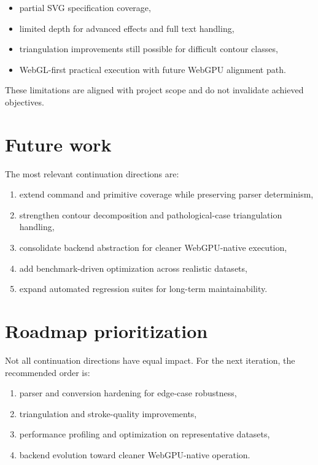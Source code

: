 \begin{itemize}
\item partial SVG specification coverage,
\item limited depth for advanced effects and full text handling,
\item triangulation improvements still possible for difficult contour classes,
\item WebGL-first practical execution with future WebGPU alignment path.
\end{itemize}

These limitations are aligned with project scope and do not invalidate achieved objectives.

\section{Future work}

The most relevant continuation directions are:

\begin{enumerate}
\item extend command and primitive coverage while preserving parser determinism,
\item strengthen contour decomposition and pathological-case triangulation handling,
\item consolidate backend abstraction for cleaner WebGPU-native execution,
\item add benchmark-driven optimization across realistic datasets,
\item expand automated regression suites for long-term maintainability.
\end{enumerate}

\section{Roadmap prioritization}

Not all continuation directions have equal impact.
For the next iteration, the recommended order is:

\begin{enumerate}
\item parser and conversion hardening for edge-case robustness,
\item triangulation and stroke-quality improvements,
\item performance profiling and optimization on representative datasets,
\item backend evolution toward cleaner WebGPU-native operation.
\end{enumerate}

